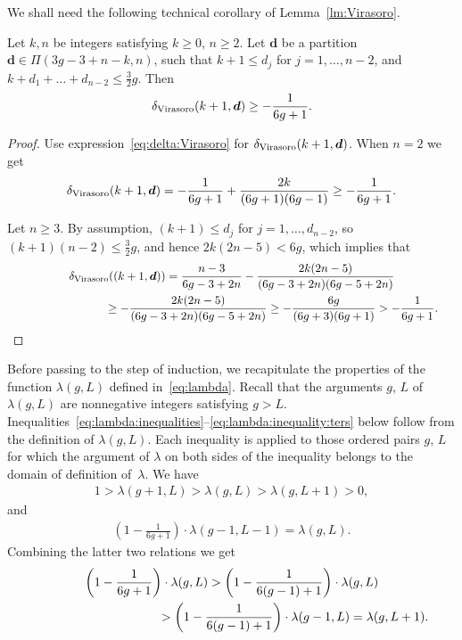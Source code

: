 We shall need the following technical corollary of Lemma~\ref{lm:Virasoro}.

\begin{Corollary}\label{cor:delat:Virasoro:bound}
Let $k,n$ be integers satisfying $k\ge 0$, $n\ge 2$.
Let $\boldsymbol{d}$ be a partition $\boldsymbol{d}\in\Pi(3g-3+n-k,n)$, such that
$k+1\le d_j$ for $j=1,\dots,n-2$,
and $k+d_1+\dots+d_{n-2}\le\frac{3}{2}g$.
Then
\begin{gather}\label{eq:delat:Virasoro:bound}
\delta_{\rm Virasoro}(k+1,\boldsymbol{d})\ge -\frac{1}{6g+1} .
\end{gather}
\end{Corollary}

\begin{proof}Use expression~\eqref{eq:delta:Virasoro} for
$\delta_{\rm Virasoro}(k+1,\boldsymbol{d})$.
When $n=2$ we get
\[
\delta_{\rm Virasoro}(k+1,\boldsymbol{d})=-\frac{1}{6g+1}+\frac{2k}{(6g+1)(6g-1)}\ge-\frac{1}{6g+1} .
\]

Let $n\ge 3$. By assumption, $(k+1)\le d_j$ for $j=1,\dots,d_{n-2}$, so $(k+1)(n-2)\le \frac{3}{2}g$, and hence $2k(2n-5)< 6g$, which implies that
\begin{gather*}
\delta_{\rm Virasoro}((k+1,\boldsymbol{d}))=\frac{n-3}{6g-3+2n}-\frac{2k(2n-5)}{(6g-3+2n)(6g-5+2n)}\\
\hphantom{\delta_{\rm Virasoro}((k+1,\boldsymbol{d}))}{} \ge -\frac{2k(2n-5)}{(6g-3+2n)(6g-5+2n)}
\ge -\frac{6g}{(6g+3)(6g+1)}>-\frac{1}{6g+1} .\!\!\!\tag*{\qed}
\end{gather*}\renewcommand{\qed}{}
\end{proof}

Before passing to the step of induction, we recapitulate the properties of the function $\lambda(g,L)$ defined in~\eqref{eq:lambda}.
Recall that the arguments $g$, $L$ of $\lambda(g,L)$ are nonnegative integers
satisfying $g>L$. Inequalities~\eqref{eq:lambda:inequalities}--\eqref{eq:lambda:inequality:ters}
below follow from the definition of $\lambda(g,L)$. Each inequality is
applied to those ordered pairs $g$, $L$ for which the argument of $\lambda$ on
both sides of the inequality belongs to the domain of definition of~$\lambda$. We have
\begin{gather}\label{eq:lambda:inequalities}
1>\lambda(g+1,L)>\lambda(g,L)>\lambda(g,L+1)>0 ,
\end{gather}
and
\begin{gather}\label{eq:lambda:inequality:bis}
\left(1-\frac{1}{6g+1}\right)
\cdot\lambda(g-1,L-1)=\lambda(g,L) .
\end{gather}
Combining the latter two relations we get
\begin{gather}
\left(1-\frac{1}{6g+1}\right)\cdot\lambda(g,L)>\left(1-\frac{1}{6(g-1)+1}\right)\cdot\lambda(g,L)\nonumber\\
\hphantom{\left(1-\frac{1}{6g+1}\right)\cdot\lambda(g,L)}{} >\left(1-\frac{1}{6(g-1)+1}\right)
\cdot\lambda(g-1,L) =\lambda(g,L+1) .\label{eq:lambda:inequality:ters}
\end{gather}

